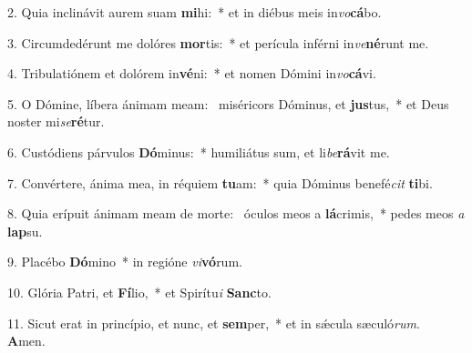 2. Quia inclinávit aurem suam \textbf{mi}hi:~*  et in diébus meis in\textit{vo}\textbf{cá}bo.\

3. Circumdedérunt me dolóres \textbf{mor}tis:~*  et perícula inférni in\textit{ve}\textbf{né}runt me.\

4. Tribulatiónem et dolórem in\textbf{vé}ni:~*  et nomen Dómini in\textit{vo}\textbf{cá}vi.\

5. O Dómine, líbera ánimam meam: \dag\  miséricors Dóminus, et \textbf{jus}tus,~*  et Deus noster mi\textit{se}\textbf{ré}tur.\

6. Custódiens párvulos \textbf{Dó}minus:~*  humiliátus sum, et li\textit{be}\textbf{rá}vit me.\

7. Convértere, ánima mea, in réquiem \textbf{tu}am:~*  quia Dóminus benefé\textit{cit} \textbf{ti}bi.\

8. Quia erípuit ánimam meam de morte: \dag\  óculos meos a \textbf{lá}crimis,~*  pedes meos \textit{a} \textbf{lap}su.\

9. Placébo \textbf{Dó}mino~*  in regióne \textit{vi}\textbf{vó}rum.\

10. Glória Patri, et \textbf{Fí}lio,~*  et Spirítu\textit{i} \textbf{Sanc}to.\

11. Sicut erat in princípio, et nunc, et \textbf{sem}per,~*  et in sǽcula sæculó\textit{rum}. \textbf{A}men.\

